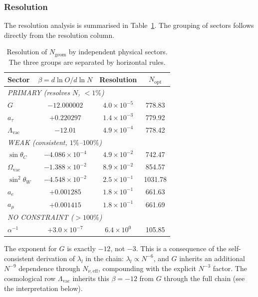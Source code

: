 \documentclass[10pt,a4paper]{article}
\begin{document}
\subsubsection{Resolution}

The resolution analysis is summarised in
Table~\ref{tab:lock_in_results}. The grouping of sectors follows directly
from the resolution column.

\begin{table}[h!]
	\centering
	\small
	\caption{Resolution of $N_{\text{geom}}$ by independent physical sectors.
		The three groups are separated by horizontal rules.}
	\label{tab:lock_in_results}
	\begin{tabular}{lccc}
		\toprule
		\textbf{Sector} & $\beta = d\ln O / d\ln N$ & \textbf{Resolution} & $N_{\text{opt}}$ \\
		\midrule
		\multicolumn{4}{l}{\textit{PRIMARY (resolves $N$, $< 1\%$)}} \\
		$G$              & $-12.000002$              & $4.0 \times 10^{-5}$ & 778.83 \\
		$a_\tau$         & $+0.220297$               & $1.4 \times 10^{-3}$ & 779.92 \\
		$\Lambda_{\text{vac}}$ & $-12.01$            & $4.9 \times 10^{-4}$ & 778.42 \\
		\midrule
		\multicolumn{4}{l}{\textit{WEAK (consistent, $1\%$--$100\%$)}} \\
		$\sin\theta_C$   & $-4.086 \times 10^{-4}$   & $4.9 \times 10^{-2}$ & 742.47 \\
		$\Omega_{\text{vac}}$ & $-1.388 \times 10^{-2}$ & $8.9 \times 10^{-2}$ & 854.57 \\
		$\sin^2\theta_W$ & $-4.548 \times 10^{-2}$   & $2.5 \times 10^{-1}$ & 1031.78 \\
		$a_e$            & $+0.001285$               & $1.8 \times 10^{-1}$ & 661.63 \\
		$a_\mu$          & $+0.001415$               & $1.8 \times 10^{-1}$ & 661.69 \\
		\midrule
		\multicolumn{4}{l}{\textit{NO CONSTRAINT ($> 100\%$)}} \\
		$\alpha^{-1}$    & $+3.0 \times 10^{-7}$     & $6.4 \times 10^{0}$  & 105.85 \\
		\bottomrule
	\end{tabular}
\end{table}

The exponent for $G$ is exactly $-12$, not $-3$. This is a consequence of the
self-consistent derivation of $\lambda_l$ in the chain:
$\lambda_l \propto N^{-6}$, and $G$ inherits an additional $N^{-9}$
dependence through $N_{\nu,\text{eff}}$, compounding with the explicit
$N^{-3}$ factor. The cosmological row $\Lambda_{\text{vac}}$ inherits this
$\beta = -12$ from $G$ through the full chain (see the interpretation
below).
\end{document}
